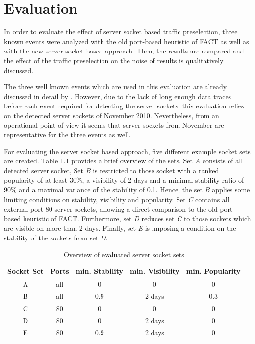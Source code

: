 

\chapter{Evaluation 
\label{chapter:results}}

In order to evaluate the effect of server socket based traffic preselection, three known events were analyzed with the old port-based heuristic of FACT as well as with the new server socket based approach. Then, the results are compared and the effect of the traffic preselection on the noise of results is qualitatively discussed.

The three well known events which are used in this evaluation are already discussed in detail by \citet{SchatzmannPAM2011}. However, due to the lack of long enough data traces before each event required for detecting the server sockets, this evaluation relies on the detected server sockets of November 2010. 
Nevertheless, from an operational point of view it seems that server sockets from November are representative for the three events as well. 

For evaluating the server socket based approach, five different example socket sets are created. Table \ref{tab:ses_sets} provides a brief overview of the sets. Set \emph{A} consists of all detected server socket, Set \emph{B} is restricted to those socket with a ranked popularity of at least 30\%, a visibility of 2 days and a minimal stability ratio of 90\% and a maximal variance of the stability of 0.1. Hence, the set \emph{B} applies some limiting conditions on stability, visibility and popularity. 
Set \emph{C} contains all external port 80 server sockets, allowing a direct comparison to the old port-based heuristic of FACT. Furthermore, set \emph{D} reduces set \emph{C} to those sockets which are visible on more than 2 days. Finally, set \emph{E} is imposing a condition on the stability of the sockets from set \emph{D}. 
\begin{table}
	[ht] \centering 
	\begin{tabular}
		{|c|c|c|c|c|} \hline \textbf{Socket Set} & \textbf{Ports} & \textbf{min. Stability} & \textbf{min. Visibility} & \textbf{min. Popularity} \\
		\hline \hline A & all & 0 & 0 & 0\\
		\hline B & all & 0.9 & 2 days & 0.3 \\
		\hline C & 80 & 0 & 0 & 0 \\
		\hline D & 80 & 0 & 2 days & 0 \\
		\hline E & 80 & 0.9 & 2 days & 0 \\
		\hline 
	\end{tabular}
	\caption{Overview of evaluated server socket sets} 
	\label{tab:ses_sets} 
\end{table}

